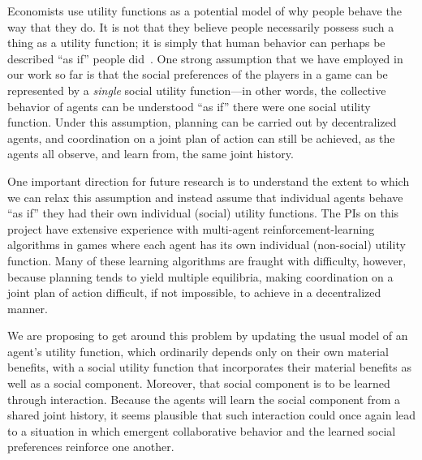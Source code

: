 Economists use utility functions as a potential model of why people
behave the way that they do.  It is not that they believe people
necessarily possess such a thing as a utility function; it is simply
that human behavior can perhaps be described ``as if'' people
did~\cite{Savage1954}.  One strong assumption that we have employed in
our work so far is that the social preferences of the players in a
game can be represented by a \emph{single\/} social utility
function---in other words, the collective behavior of agents can be
understood ``as if'' there were one social utility function.  Under
this assumption, planning can be carried out by decentralized agents,
and coordination on a joint plan of action can still be achieved, as
the agents all observe, and learn from, the same joint history.

One important direction for future research is to understand the
extent to which we can relax this assumption and instead assume that
individual agents behave ``as if'' they had their own individual
(social) utility functions.  The PIs on this project have extensive
experience with multi-agent reinforcement-learning algorithms in games
where each agent has its own individual (non-social) utility function.
Many of these learning algorithms are fraught with difficulty,
however, because planning tends to yield multiple equilibria, making
coordination on a joint plan of action difficult, if not impossible,
to achieve in a decentralized manner.

We are proposing to get around this problem by updating the usual
model of an agent's utility function, which ordinarily depends only on
their own material benefits, with a social utility function that
incorporates their material benefits as well as a social component.
Moreover, that social component is to be learned through interaction.
Because the agents will learn the social component from a shared joint
history, it seems plausible that such interaction could once again
lead to a situation in which emergent collaborative behavior and the
learned social preferences reinforce one another.

